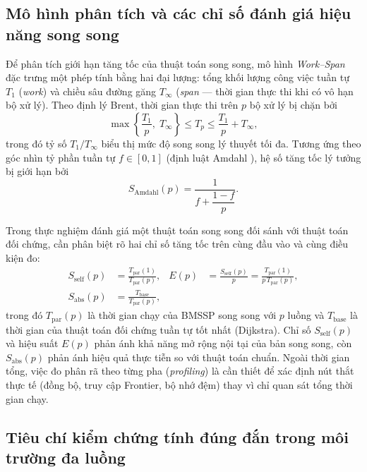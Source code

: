 \subsection{Mô hình phân tích và các chỉ số đánh giá hiệu năng song song}

Để phân tích giới hạn tăng tốc của thuật toán song song, mô hình \textit{Work--Span} đặc trưng một phép tính bằng hai đại lượng: tổng khối lượng công việc tuần tự $T_1$ (\textit{work}) và chiều sâu đường găng $T_\infty$ (\textit{span} --- thời gian thực thi khi có vô hạn bộ xử lý). Theo định lý Brent\cite{brent1974parallel}, thời gian thực thi trên $p$ bộ xử lý bị chặn bởi
\begin{equation}
    \max\left\{\frac{T_1}{p},\; T_\infty\right\} \le T_p \le \frac{T_1}{p} + T_\infty,
    \label{eq:brent}
\end{equation}
trong đó tỷ số $T_1 / T_\infty$ biểu thị mức độ song song lý thuyết tối đa. Tương ứng theo góc nhìn tỷ phần tuần tự $f \in [0, 1]$ (định luật Amdahl \cite{amdahl1967validity}), hệ số tăng tốc lý tưởng bị giới hạn bởi
\begin{equation}
    S_{\mathrm{Amdahl}}(p) = \frac{1}{f + \dfrac{1-f}{p}}.
    \label{eq:amdahl}
\end{equation}

Trong thực nghiệm đánh giá một thuật toán song song đối sánh với thuật toán đối chứng, cần phân biệt rõ hai chỉ số tăng tốc trên cùng đầu vào và cùng điều kiện đo:
\begin{align}
    S_{\mathrm{self}}(p) &= \frac{T_{\mathrm{par}}(1)}{T_{\mathrm{par}}(p)}, &
    E(p) &= \frac{S_{\mathrm{self}}(p)}{p} = \frac{T_{\mathrm{par}}(1)}{p\,T_{\mathrm{par}}(p)},
    \label{eq:self-speedup} \\
    S_{\mathrm{abs}}(p) &= \frac{T_{\mathrm{base}}}{T_{\mathrm{par}}(p)},
    \label{eq:abs-speedup}
\end{align}
trong đó $T_{\mathrm{par}}(p)$ là thời gian chạy của BMSSP song song với $p$ luồng và $T_{\mathrm{base}}$ là thời gian của thuật toán đối chứng tuần tự tốt nhất (Dijkstra). Chỉ số $S_{\mathrm{self}}(p)$ và hiệu suất $E(p)$ phản ánh khả năng mở rộng nội tại của bản song song, còn $S_{\mathrm{abs}}(p)$ phản ánh hiệu quả thực tiễn so với thuật toán chuẩn. Ngoài thời gian tổng, việc đo phân rã theo từng pha (\textit{profiling}) là cần thiết để xác định nút thắt thực tế (đồng bộ, truy cập Frontier, bộ nhớ đệm) thay vì chỉ quan sát tổng thời gian chạy.

\subsection{Tiêu chí kiểm chứng tính đúng đắn trong môi trường đa luồng}


